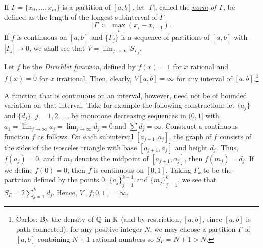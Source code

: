If $\Gamma=\{x_0,\dotsc,x_m\}$ is a partition of $[a,b]$, let $|\Gamma|$,
called the
\href{https://en.wikipedia.org/wiki/Partition_of_an_interval#Norm_of_a_partition}{\emph{norm}}
\emph{of $\Gamma$}, be defined as the length of the longest subinterval of
$\Gamma$
\begin{equation}
\label{eq:bv:partition-norm}
|\Gamma|\coloneqq\max_{i}(x_i-x_{i-1}).
\end{equation}
If $f$ is continuous on $[a,b]$ and $\{\Gamma_j\}$ is a sequence of
partitions of $[a,b]$ with $|\Gamma_j|\to 0$, we shall see that
$V=\lim_{j\to\infty} S_{\Gamma_j}$.

\begin{example}
Let $f$ be the
\href{https://en.wikipedia.org/wiki/Dirichlet_function}{\emph{Dirichlet
    function}}, defined by $f(x)=1$ for $x$ rational and $f(x)=0$ for $x$
irrational. Then, clearly, $V[a,b]=\infty$ for any interval of
$[a,b]$.\footnote{Carlos: By the density of $\mathbb{Q}$ in $\mathbb{R}$ (and by
  restriction, $[a,b]$, since $[a,b]$ is path-connected), for any
  positive integer $N$, we may choose a partition $\Gamma$ of $[a,b]$
  containing $N+1$ rational numbers so $S_\Gamma=N+1>N$.}
\end{example}

\begin{example}
A function that is continuous on an interval, however, need not be of
bounded variation on that interval. Take for example the following
construction: let $\{a_j\}$ and $\{d_j\}$, $j=1,2,\dotsc$, be monotone
decreasing sequences in $(0,1]$ with $a_1=\lim_{j\to\infty}
a_j=\lim_{j\to\infty}d_j=0$ and $\sum d_j=\infty$. Construct a continuous
function $f$ as follows. On each subinterval $[a_{j+1},a_j]$, the graph of
$f$ consists of the sides of the isosceles triangle with base
$[a_{j+1},a_j]$ and height $d_j$. Thus, $f(a_j)=0$, and if $m_j$ denotes
the midpoint of $[a_{j+1},a_j]$, then $f(m_j)=d_j$. If we define $f(0)=0$,
then $f$ is continuous on $[0,1]$. Taking $\Gamma_k$ to be the partition
defined by the points $0$, ${\{a_j\}}_{j=1}^{k+1}$ and ${\{m_j\}}_{j=1}^k$,
we see that $S_\Gamma=2\sum_{j=1}^k d_j$. Hence, $V[f;0,1]=\infty$.
\end{example}



